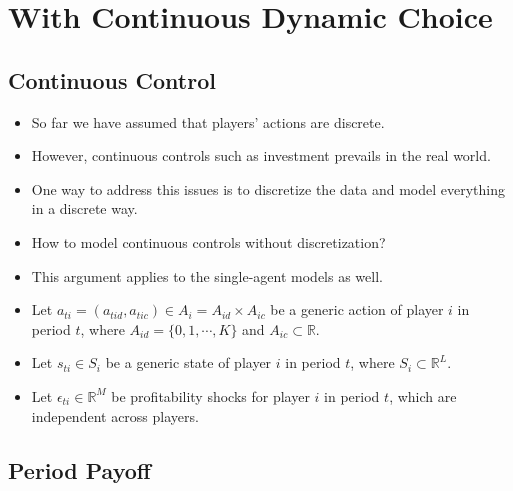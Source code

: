 \documentclass[
]{book}
\providecommand{\tightlist}{%
  \setlength{\itemsep}{0pt}\setlength{\parskip}{0pt}}
\begin{document}
\hypertarget{with-continuous-dynamic-choice}{%
\section{With Continuous Dynamic Choice}\label{with-continuous-dynamic-choice}}

\hypertarget{continuous-control}{%
\subsection{Continuous Control}\label{continuous-control}}

\begin{itemize}
\tightlist
\item
  So far we have assumed that players' actions are discrete.
\item
  However, continuous controls such as investment prevails in the real world.
\item
  One way to address this issues is to discretize the data and model everything in a discrete way.
\item
  How to model continuous controls without discretization?
\item
  This argument applies to the single-agent models as well.
\item
  Let \(a_{ti} = (a_{tid}, a_{tic}) \in A_i = A_{id} \times A_{ic}\) be a generic action of player \(i\) in period \(t\), where \(A_{id} = \{0, 1, \cdots, K\}\) and \(A_{ic} \subset \mathbb{R}\).
\item
  Let \(s_{ti} \in S_i\) be a generic state of player \(i\) in period \(t\), where \(S_i \subset \mathbb{R}^L\).
\item
  Let \(\epsilon_{ti} \in \mathbb{R}^M\) be profitability shocks for player \(i\) in period \(t\), which are independent across players.
\end{itemize}

\hypertarget{period-payoff-1}{%
\subsection{Period Payoff}\label{period-payoff-1}}
\end{document}
